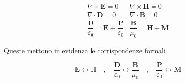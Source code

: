 \begin{tcolorbox}[colback=yellow!10!white, colframe=orange!70!black, boxrule=0.8pt]
\begin{equation}
\begin{array}{cc}
\nabla \times \mathbf{E} = 0 & \nabla \times \mathbf{H} = 0 \\[1.2em]
\nabla \cdot \mathbf{D} = 0 & \nabla \cdot \mathbf{B} = 0 \\[1.2em]
\dfrac{\mathbf{D}}{\varepsilon_0} = \mathbf{E} + \dfrac{\mathbf{P}}{\varepsilon_0}
&
\dfrac{\mathbf{B}}{\mu_0} = \mathbf{H} + \mathbf{M}
\end{array}
\end{equation}
\end{tcolorbox}

Queste mettono in evidenza le corrispondenze formali

\begin{tcolorbox}[colback=yellow!10!white, colframe=orange!70!black, boxrule=0.8pt]
\begin{equation}
    \mathbf{E} \leftrightarrow \mathbf{H} \quad , \quad \frac{\mathbf{D}}{\varepsilon_0} \leftrightarrow \frac{\mathbf{B}}{\mu_0}  \quad , \quad \frac{\mathbf{P}}{\varepsilon_0} \leftrightarrow \mathbf{M}
\end{equation}
\end{tcolorbox}